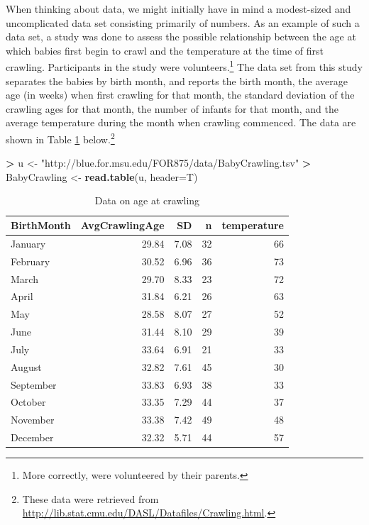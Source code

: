 \documentclass[]{krantz}
\makeatletter
\newenvironment{Shaded}{\begin{snugshade}}{\end{snugshade}}
\newcommand{\KeywordTok}[1]{\textcolor[rgb]{0.27,0.27,0.27}{\textbf{#1}}}
\newcommand{\DataTypeTok}[1]{\textcolor[rgb]{0.27,0.27,0.27}{#1}}
\newcommand{\StringTok}[1]{\textcolor[rgb]{0.5,0.5,0.5}{#1}}
\newcommand{\OperatorTok}[1]{\textcolor[rgb]{0.43,0.43,0.43}{\textbf{#1}}}
\newcommand{\NormalTok}[1]{#1}
\newenvironment{kframe}{%
\medskip{}
\setlength{\fboxsep}{.8em}
 \def\at@end@of@kframe{}%
 \ifinner\ifhmode%
  \def\at@end@of@kframe{\end{minipage}}%
  \begin{minipage}{\columnwidth}%
 \fi\fi%
 \def\FrameCommand##1{\hskip\@totalleftmargin \hskip-\fboxsep
 \colorbox{shadecolor}{##1}\hskip-\fboxsep
     \hskip-\linewidth \hskip-\@totalleftmargin \hskip\columnwidth}%
 \MakeFramed {\advance\hsize-\width
   \@totalleftmargin\z@ \linewidth\hsize
   \@setminipage}}%
 {\par\unskip\endMakeFramed%
 \at@end@of@kframe}
\renewenvironment{Shaded}{\begin{kframe}}{\end{kframe}}
\makeatother
\begin{document}
When thinking about data, we might initially have in mind a modest-sized
and uncomplicated data set consisting primarily of numbers. As an
example of such a data set, a study was done to assess the possible
relationship between the age at which babies first begin to crawl and
the temperature at the time of first crawling. Participants in the study
were volunteers.\footnote{More correctly, were volunteered by their
  parents.} The data set from this study separates the babies by birth
month, and reports the birth month, the average age (in weeks) when
first crawling for that month, the standard deviation of the crawling
ages for that month, the number of infants for that month, and the
average temperature during the month when crawling commenced. The data
are shown in Table \ref{tab:crawling} below.\footnote{These data were
  retrieved from
  \url{http://lib.stat.cmu.edu/DASL/Datafiles/Crawling.html}.}

\begin{Shaded}
\begin{Highlighting}[]
\OperatorTok{>}\StringTok{ }\NormalTok{u <-}\StringTok{ "http://blue.for.msu.edu/FOR875/data/BabyCrawling.tsv"}
\OperatorTok{>}\StringTok{ }\NormalTok{BabyCrawling <-}\StringTok{ }\KeywordTok{read.table}\NormalTok{(u, }\DataTypeTok{header=}\NormalTok{T)}
\end{Highlighting}
\end{Shaded}

\begin{table}[t]

\caption{\label{tab:crawling}Data on age at crawling}
\centering
\begin{tabular}{lrrrr}
\toprule
BirthMonth & AvgCrawlingAge & SD & n & temperature\\
\midrule
January & 29.84 & 7.08 & 32 & 66\\
February & 30.52 & 6.96 & 36 & 73\\
March & 29.70 & 8.33 & 23 & 72\\
April & 31.84 & 6.21 & 26 & 63\\
May & 28.58 & 8.07 & 27 & 52\\
\addlinespace
June & 31.44 & 8.10 & 29 & 39\\
July & 33.64 & 6.91 & 21 & 33\\
August & 32.82 & 7.61 & 45 & 30\\
September & 33.83 & 6.93 & 38 & 33\\
October & 33.35 & 7.29 & 44 & 37\\
\addlinespace
November & 33.38 & 7.42 & 49 & 48\\
December & 32.32 & 5.71 & 44 & 57\\
\bottomrule
\end{tabular}
\end{table}
\end{document}
